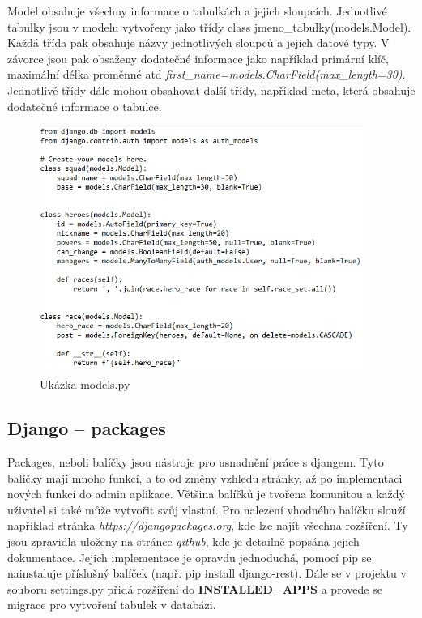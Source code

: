 Model obsahuje všechny informace o tabulkách a jejich sloupcích. Jednotlivé tabulky jsou v modelu vytvořeny jako třídy class jmeno\_tabulky(models.Model). Každá třída pak obsahuje názvy jednotlivých sloupců a jejich datové typy. V závorce jsou pak obsaženy dodatečné informace jako například primární klíč, maximální délka proměnné atd \textit{first\_name=models.CharField(max\_length=30)}. Jednotlivé třídy dále mohou obsahovat další třídy, například meta, která obsahuje dodatečné informace o tabulce.

\vspace{15px}

\begin{figure}[H] \centering
    \includegraphics[width=300pt]{./pictures/2-model-example.png}
    \caption[Model příklad]{Ukázka models.py \cite{}}
	\label{fig:Ukázka models.py}                                
\end{figure}

\newpage

\subsection{Django – packages}

Packages, neboli balíčky jsou nástroje pro usnadnění práce s djangem. Tyto balíčky mají mnoho funkcí, a to od změny vzhledu stránky, až po implementaci nových funkcí do admin aplikace. Většina balíčků je tvořena komunitou a každý uživatel si také může vytvořit svůj vlastní. Pro nalezení vhodného balíčku slouží například stránka \textit{https://djangopackages.org}, kde lze najít všechna rozšíření. Ty jsou zpravidla uloženy na stránce \textit{github}, kde je detailně popsána jejich dokumentace. Jejich implementace je opravdu jednoduchá, pomocí pip se nainstaluje příslušný balíček (např. pip install django-rest). Dále se v projektu v souboru settings.py přidá rozšíření do \textbf{INSTALLED\_APPS} a provede se migrace pro vytvoření tabulek v databázi.

